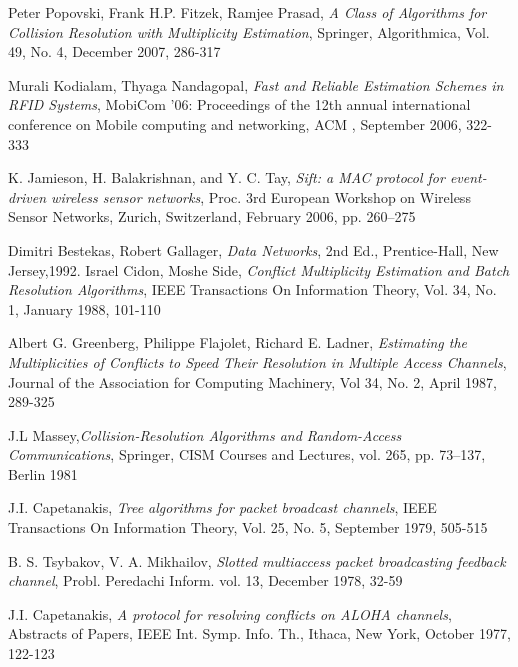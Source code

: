 \begin{thebibliography}{99}
 
  Peter Popovski, Frank H.P. Fitzek, Ramjee Prasad, \emph{ A Class of Algorithms for Collision Resolution with Multiplicity Estimation}, Springer, Algorithmica, Vol. 49, No. 4, December 2007, 286-317
  
Murali Kodialam, Thyaga Nandagopal, \emph{Fast and Reliable Estimation Schemes in RFID Systems}, MobiCom '06: Proceedings of the 12th annual international conference on Mobile computing and networking, ACM , September 2006, 322-333 
 
K. Jamieson, H. Balakrishnan, and Y. C. Tay, \emph{Sift: a MAC protocol for event-driven wireless sensor networks},  Proc. 3rd European Workshop on Wireless Sensor Networks, Zurich, Switzerland, February 2006, pp. 260–275 

Dimitri Bestekas, Robert Gallager, \emph{Data Networks}, 2nd Ed., Prentice-Hall, New Jersey,1992.
 Israel Cidon, Moshe Side, \emph{Conflict Multiplicity Estimation and Batch Resolution Algorithms}, IEEE Transactions On Information Theory, Vol. 34, No. 1, January 1988, 101-110
 
  Albert G. Greenberg, Philippe Flajolet,  Richard E. Ladner,
  \emph{Estimating the Multiplicities of Conflicts to Speed Their Resolution in Multiple Access Channels},
  Journal of the Association for Computing Machinery,
  Vol 34, No. 2, April 1987, 289-325
 
  J.L Massey,\emph{Collision-Resolution Algorithms and Random-Access Communications}, Springer, CISM Courses and Lectures, vol. 265, pp. 73–137, Berlin 1981
  
  J.I. Capetanakis, \emph{ Tree algorithms for packet broadcast channels}, IEEE Transactions On Information Theory, Vol. 25, No. 5, September 1979, 505-515
 
B. S. Tsybakov, V. A. Mikhailov, \emph{Slotted multiaccess packet broadcasting feedback channel}, Probl. Peredachi Inform. vol. 13, December 1978, 32-59
 
J.I. Capetanakis, \emph{A protocol for resolving conflicts on ALOHA channels}, Abstracts of Papers, IEEE Int. Symp. Info. Th., Ithaca, New York, October 1977, 122-123

 \end{thebibliography}
 
